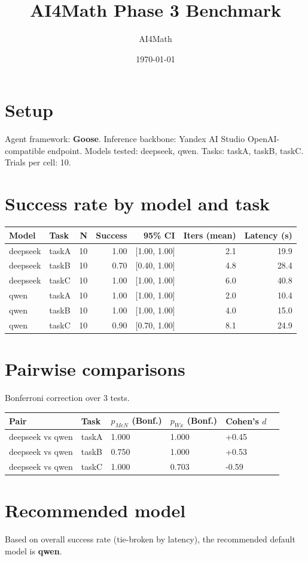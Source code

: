 \documentclass[11pt]{article}
\title{AI4Math Phase 3 Benchmark}
\author{AI4Math}
\date{\today}
\begin{document}
\maketitle
\section{Setup}
Agent framework: \textbf{Goose}. Inference backbone: Yandex AI Studio OpenAI-compatible endpoint. Models tested: deepseek, qwen. Tasks: taskA, taskB, taskC. Trials per cell: 10.
\section{Success rate by model and task}
\begin{tabular}{llrrrrr}
\toprule
Model & Task & N & Success & 95\% CI & Iters (mean) & Latency (s) \\
\midrule
deepseek & taskA & 10 & 1.00 & [1.00, 1.00] & 2.1 & 19.9 \\
deepseek & taskB & 10 & 0.70 & [0.40, 1.00] & 4.8 & 28.4 \\
deepseek & taskC & 10 & 1.00 & [1.00, 1.00] & 6.0 & 40.8 \\
qwen & taskA & 10 & 1.00 & [1.00, 1.00] & 2.0 & 10.4 \\
qwen & taskB & 10 & 1.00 & [1.00, 1.00] & 4.0 & 15.0 \\
qwen & taskC & 10 & 0.90 & [0.70, 1.00] & 8.1 & 24.9 \\
\bottomrule
\end{tabular}
\section{Pairwise comparisons}
Bonferroni correction over 3 tests.
\begin{tabular}{lllllr}
\toprule
Pair & Task & $p_{McN}$ (Bonf.) & $p_{Wx}$ (Bonf.) & Cohen's $d$ \\
\midrule
deepseek vs qwen & taskA & 1.000 & 1.000 & +0.45 \\
deepseek vs qwen & taskB & 0.750 & 1.000 & +0.53 \\
deepseek vs qwen & taskC & 1.000 & 0.703 & -0.59 \\
\bottomrule
\end{tabular}
\section{Recommended model}
Based on overall success rate (tie-broken by latency), the recommended default model is \textbf{qwen}.
\end{document}
